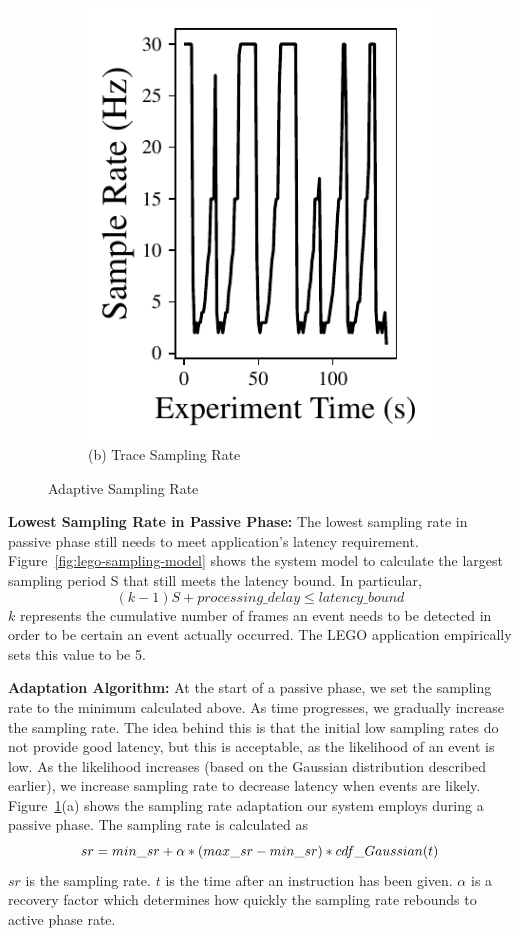 \begin{figure}
\begin{subfigure}{.45\linewidth}
    \centering
    \includegraphics[width=0.92\linewidth, trim=0em 0em 0em 0em, clip]{FIGS/fig-lego-example-sr.pdf}
   {\small (b) Trace Sampling Rate}
\end{subfigure}
\caption{\small Adaptive Sampling Rate}
\label{fig:adaptive-sampling-example}
\end{figure}

\textbf{Lowest Sampling Rate in Passive Phase: }
The lowest sampling rate in passive phase still needs to meet application's
latency requirement. Figure~\ref{fig:lego-sampling-model} shows the system model
to calculate the largest sampling period S that still meets the latency bound.
In particular,
$$(k-1)S + processing\_delay \leq latency\_bound $$ $k$ represents the
cumulative number of frames an event needs to be detected in order to be
certain an event actually occurred. The LEGO application empirically sets this
value to be 5. 

\textbf{Adaptation Algorithm: }
At the start of a passive phase, we set the sampling rate to the
minimum calculated above.  As time progresses, we gradually increase
the sampling rate.  The idea behind this is that the initial low
sampling rates do not provide good latency, but this is acceptable, as
the likelihood of an event is low.  As the likelihood increases (based
on the Gaussian distribution described earlier), we increase sampling
rate to decrease latency when events are likely.
Figure~\ref{fig:adaptive-sampling-example}(a) shows the sampling rate
adaptation our system employs during a passive phase.
The sampling rate is calculated as $$sr = \\
%
 min\_sr + \alpha * (max\_sr - min\_sr) * cdf\_Gaussian(t)$$ 
%
$sr$ is the sampling rate. $t$ is the time after an instruction has been given. $\alpha$ is
a recovery factor which determines how quickly the sampling rate
rebounds to active phase rate. 


